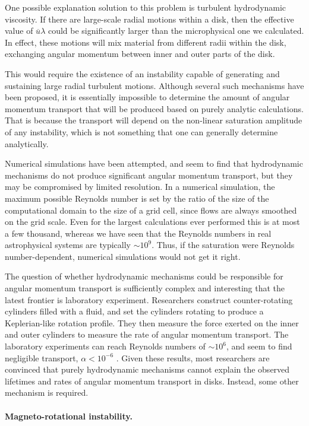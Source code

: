 One possible explanation solution to this problem is turbulent hydrodynamic viscosity. If there are large-scale radial motions within a disk, then the effective value of $\overline{u}\lambda$ could be significantly larger than the microphysical one we calculated. In effect, these motions will mix material from different radii within the disk, exchanging angular momentum between inner and outer parts of the disk.

This would require the existence of an instability capable of generating and sustaining large radial turbulent motions. Although several such mechanisms have been proposed, it is essentially impossible to determine the amount of angular momentum transport that will be produced based on purely analytic calculations. That is because the transport will depend on the non-linear saturation amplitude of any instability, which is not something that one can generally determine analytically.

Numerical simulations have been attempted, and seem to find that hydrodynamic mechanisms do not produce significant angular momentum transport, but they may be compromised by limited resolution. In a numerical simulation, the maximum possible Reynolds number is set by the ratio of the size of the computational domain to the size of a grid cell, since flows are always smoothed on the grid scale. Even for the largest calculations ever performed this is at most a few thousand, whereas we have seen that the Reynolds numbers in real astrophysical systems are typically $\sim 10^9$. Thus, if the saturation were Reynolds number-dependent, numerical simulations would not get it right.

The question of whether hydrodynamic mechanisms could be responsible for angular momentum transport is sufficiently complex and interesting that the latest frontier is laboratory experiment. Researchers construct counter-rotating cylinders filled with a fluid, and set the cylinders rotating to produce a Keplerian-like rotation profile. They then measure the force exerted on the inner and outer cylinders to measure the rate of angular momentum transport. The laboratory experiments can reach Reynolds numbers of $\sim 10^6$, and seem to find negligible transport, $\alpha < 10^{-6}$ \citep{ji06a}. Given these results, most researchers are convinced that purely hydrodynamic mechanisms cannot explain the observed lifetimes and rates of angular momentum transport in disks. Instead, some other mechanism is required.

\paragraph{Magneto-rotational instability.}

